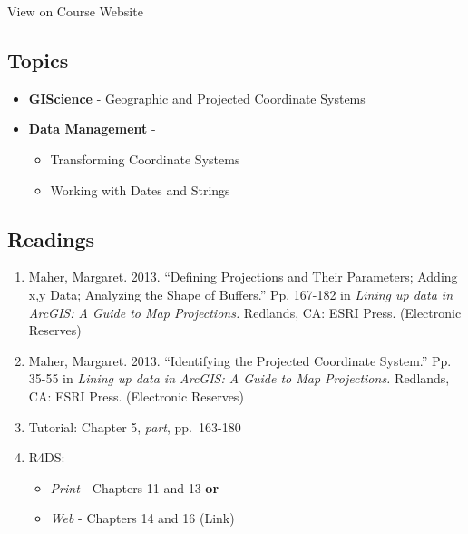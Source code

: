 \documentclass[]{book}
\providecommand{\tightlist}{%
  \setlength{\itemsep}{0pt}\setlength{\parskip}{0pt}}
\begin{document}
View on Course Website

\hypertarget{topics-10}{%
\subsection*{Topics}\label{topics-10}}

\begin{itemize}
\tightlist
\item
  \textbf{GIScience} - Geographic and Projected Coordinate Systems
\item
  \textbf{Data Management} -

  \begin{itemize}
  \tightlist
  \item
    Transforming Coordinate Systems
  \item
    Working with Dates and Strings
  \end{itemize}
\end{itemize}

\hypertarget{readings-10}{%
\subsection*{Readings}\label{readings-10}}

\begin{enumerate}
\def\labelenumi{\arabic{enumi}.}
\tightlist
\item
  Maher, Margaret. 2013. ``Defining Projections and Their Parameters; Adding x,y Data; Analyzing the Shape of Buffers.'' Pp. 167-182 in \emph{Lining up data in ArcGIS: A Guide to Map Projections.} Redlands, CA: ESRI Press. (Electronic Reserves)
\item
  Maher, Margaret. 2013. ``Identifying the Projected Coordinate System.'' Pp. 35-55 in \emph{Lining up data in ArcGIS: A Guide to Map Projections.} Redlands, CA: ESRI Press. (Electronic Reserves)
\item
  Tutorial: Chapter 5, \emph{part}, pp.~163-180
\item
  R4DS:

  \begin{itemize}
  \tightlist
  \item
    \emph{Print} - Chapters 11 and 13 \textbf{or}
  \item
    \emph{Web} - Chapters 14 and 16 (Link)
  \end{itemize}
\end{enumerate}
\end{document}
